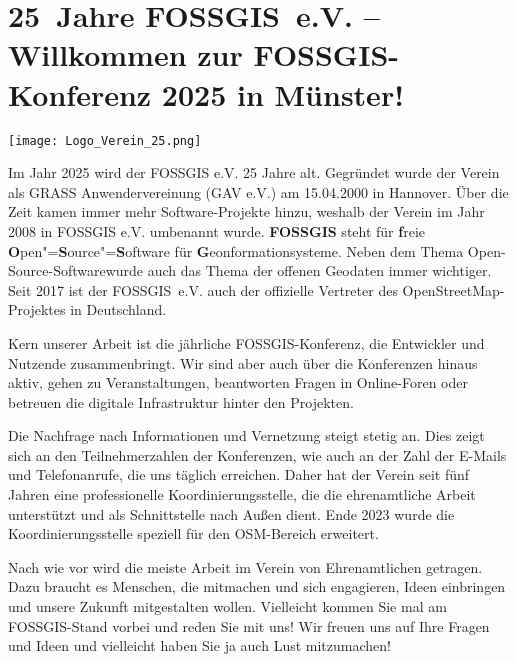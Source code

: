 \newpage
\section*{25~Jahre FOSSGIS~e.V. -- Willkommen zur FOSSGIS-Konferenz 2025 in Münster!}\label{welcome}

\begin{flushright}
\texttt{[image: Logo\_Verein\_25.png]}
\end{flushright}

\noindent
Im Jahr 2025 wird der FOSSGIS e.V. 25 Jahre alt. Gegründet wurde der Verein als
GRASS Anwendervereinung (GAV e.V.) am 15.04.2000 in Hannover. Über die Zeit
kamen immer mehr Software-Projekte hinzu, weshalb der Verein im Jahr 2008 in
FOSSGIS e.V. umbenannt wurde. {\bfseries  FOSSGIS} steht für {\bfseries f}reie
{\bfseries O}pen"={\bfseries S}ource"={\bfseries S}oftware für
{\bfseries G}eonformationsysteme.
Neben dem Thema \glqq Open-Source-Software\grqq wurde auch das
Thema der offenen Geodaten immer wichtiger. Seit 2017 ist der FOSSGIS~e.V.
auch der offizielle Vertreter des OpenStreetMap-Projektes in Deutschland.

\noindent
Kern unserer Arbeit ist die jährliche FOSSGIS-Konferenz, die Entwickler und
Nutzende zusammenbringt. Wir sind aber auch über die Konferenzen hinaus aktiv,
gehen zu Veranstaltungen, beantworten Fragen in Online-Foren oder betreuen
die digitale Infrastruktur hinter den Projekten.

\pagebreak
\noindent
Die Nachfrage nach Informationen und Vernetzung steigt stetig an. Dies zeigt sich
an den Teilnehmerzahlen der Konferenzen, wie auch an der Zahl der E-Mails und
Telefonanrufe, die uns täglich erreichen. Daher hat der Verein seit fünf Jahren
eine professionelle Koordinierungsstelle, die die ehrenamtliche Arbeit
unterstützt und als Schnittstelle nach Außen dient. Ende 2023 wurde die
Koordinierungsstelle speziell für den OSM-Bereich erweitert.

\noindent
Nach wie vor wird die meiste Arbeit im Verein von Ehrenamtlichen getragen.
Dazu braucht es Menschen, die mitmachen und sich engagieren, Ideen einbringen
und unsere Zukunft mitgestalten wollen. Vielleicht kommen Sie mal am
FOSSGIS-Stand vorbei und reden Sie mit uns! Wir freuen uns auf Ihre Fragen und
Ideen und vielleicht haben Sie ja auch Lust mitzumachen!

